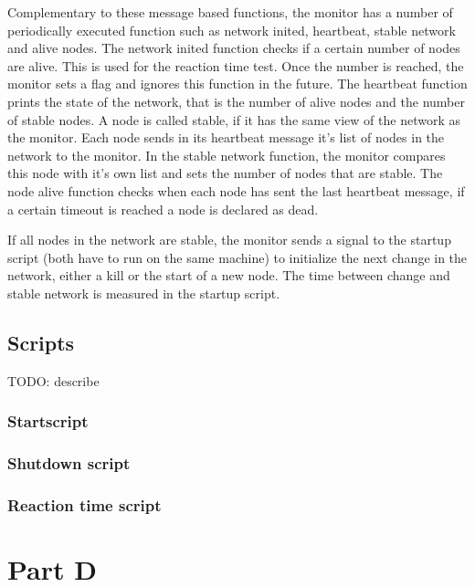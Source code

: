 \documentclass[paper=a4, fontsize=11pt]{scrartcl} %
\numberwithin{equation}{section} %
\numberwithin{figure}{section} %
\numberwithin{table}{section} %
\begin{document}
Complementary to these message based functions, the monitor has a number of periodically executed function such as network inited, heartbeat, stable network and alive nodes. The network inited function checks if a certain number of nodes are alive. This is used for the reaction time test. Once the number is reached, the monitor sets a flag and ignores this function in the future. The heartbeat function prints the state of the network, that is the number of alive nodes and the number of stable nodes. A node is called stable, if it has the same view of the network as the monitor. Each node sends in its heartbeat message it's list of nodes in the network to the monitor. In the stable network function, the monitor compares this node with it's own list and sets the number of nodes that are stable. The node alive function checks when each node has sent the last heartbeat message, if a certain timeout is reached a node is declared as dead.

If all nodes in the network are stable, the monitor sends a signal to the startup script (both have to run on the same machine) to initialize the next change in the network, either a kill or the start of a new node. The time between change and stable network is measured in the startup script.

\subsection{Scripts}

TODO: describe

\subsubsection{Startscript}

\subsubsection{Shutdown script}

\subsubsection{Reaction time script}

\section{Part D}

\end{document}
